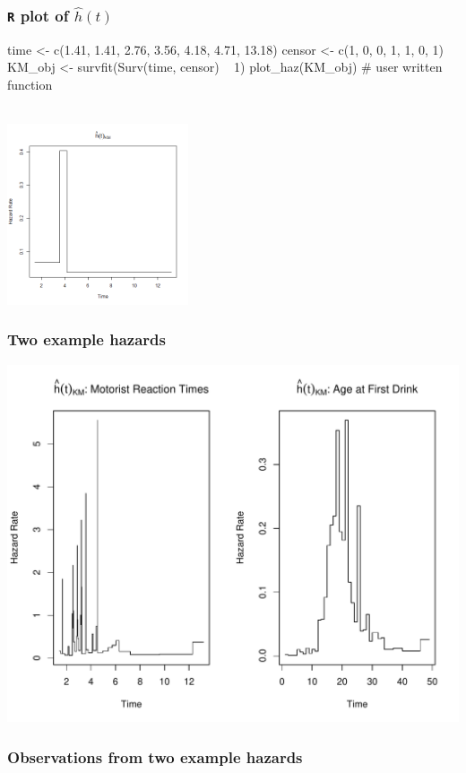 \begin{frame}[fragile]
\frametitle{\texttt{R} plot of $\hat{h}(t)$}
\begin{RcodeTiny}{.0}
time <- c(1.41, 1.41, 2.76, 3.56, 4.18, 4.71, 13.18)
censor <- c(1, 0, 0, 1, 1, 0, 1)
KM_obj <- survfit(Surv(time, censor) ~ 1)
plot_haz(KM_obj)  # user written function
\end{RcodeTiny}\\
\includegraphics[width=0.40\textwidth]{Figures/KM_haz.png}
\end{frame}

\begin{frame}
\frametitle{Two example hazards}
\includegraphics[width=1.0\textwidth]{Figures/est_haz2.pdf}
\end{frame}

\begin{frame}
\frametitle{Observations from two example hazards}
\end{frame}

